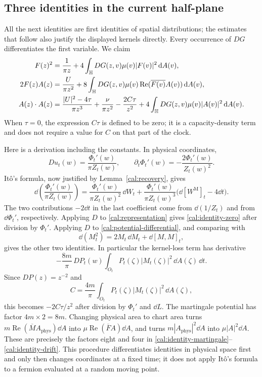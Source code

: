 \subsection{Three identities in the current half-plane}
\label{cal:identities-subsection}

All the next identities are first identities of spatial distributions;
the estimates that follow also justify the displayed kernels directly.
Every occurrence of $DG$ differentiates the first variable.  We claim
\begin{align}
 F(z)^2={}&\frac1{\pi z}
       +4\int_{\mathbb H}DG(z,v)\mu(v)|F(v)|^2\,\mathrm d A(v),
 \label{cal:identity-zero}\\
 2F(z)A(z)={}&\frac{U}{\pi z^2}
       +8\int_{\mathbb H}DG(z,v)\mu(v)
                    \operatorname{Re}(\overline{F(v)}A(v))\,\mathrm d A(v),
 \label{cal:identity-martingale}\\
 A(z)\cdot A(z)={}&\frac{|U|^2-4\tau}{\pi z^3}
       +\frac\nu{\pi z^2}-\frac{2C\tau}{z^2}
       +4\int_{\mathbb H}DG(z,v)\mu(v)|A(v)|^2\,\mathrm d A(v).
 \label{cal:identity-drift}
\end{align}
When $\tau=0$, the expression $C\tau$ is defined to be zero; it is a
capacity-density term and does not require a value for $C$ on that
part of the clock.

Here is a derivation including the constants.  In physical coordinates,
\[
 Du_t(w)=\frac{\Phi_t'(w)}{\pi Z_t(w)},\qquad
 \partial_t\Phi_t'(w)=-\frac{2\Phi_t'(w)}{Z_t(w)^2}.
\]
It\^o's formula, now justified by Lemma~\ref{cal:recovery}, gives
\begin{equation}
 \dd\left(\frac{\Phi_t'(w)}{\pi Z_t(w)}\right)
 =\frac{\Phi_t'(w)}{\pi Z_t(w)^2}\,\dd W_t
   +\frac{\Phi_t'(w)}{\pi Z_t(w)^3}
                    \bigl(\dd[W^{\mathrm M}]_t-4\dd t\bigr).
 \label{cal:ito-harmonic}
\end{equation}
The two contributions $-2\dd t$ in the last coefficient come from
$\dd(1/Z_t)$ and from $\dd\Phi_t'$, respectively.
Applying $D$ to \eqref{cal:representation} gives
\eqref{cal:identity-zero} after division by $\Phi_t'$.  Applying $D$
to \eqref{cal:potential-differential}, and comparing with
\[
 \dd(M_t^2)=2M_t\,\dd M_t+\dd[M,M]_t,
\]
gives the other two identities.  In particular the kernel-loss term
has derivative
\[
 -\frac{8m}{\pi}\,DP_t(w)
       \int_{O_t}P_t(\zeta)|M_t(\zeta)|^2\,\dd A(\zeta)\,\dd t.
\]
Since $DP(z)=z^{-2}$ and
\[
 C=\frac{4m}{\pi}\int_{O_t}P_t(\zeta)|M_t(\zeta)|^2\,\dd A(\zeta),
\]
this becomes $-2C\tau/z^2$ after division by $\Phi_t'$ and $\dd L$.
The martingale potential has factor $4m\times2=8m$.
Changing physical area to chart area turns
$m\operatorname{Re}(\overline M A_{\mathrm{phys}})\dd A$
into $\mu\operatorname{Re}(\overline F A)\dd A$, and turns
$m|A_{\mathrm{phys}}|^2\dd A$ into $\mu|A|^2\dd A$.
These are precisely the factors eight and four in
\eqref{cal:identity-martingale}--\eqref{cal:identity-drift}.
This procedure differentiates identities in physical space first and
only then changes coordinates at a fixed time; it does not apply
It\^o's formula to a fermion evaluated at a random moving point.

